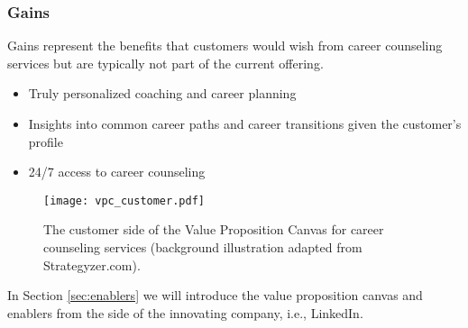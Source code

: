 \subsubsection{Gains}

Gains represent the benefits that customers would wish from career counseling services but are 
typically not part of the current offering.

\begin{itemize}
    \item Truly personalized coaching and career planning
    \item Insights into common career paths and career transitions given the customer's profile
    \item 24/7 access to career counseling
\end{itemize}

\begin{figure}[h!]
    \centering
    \caption{The customer side of the Value Proposition Canvas for career counseling services (background illustration adapted from Strategyzer.com).}
    \label{fig:vpc_customer}
    \texttt{[image: vpc\_customer.pdf]}
\end{figure}

\vspace{0.5cm}
\noindent In Section \ref{sec:enablers} we will introduce the value proposition canvas and enablers from the
side of the innovating company, i.e., LinkedIn.